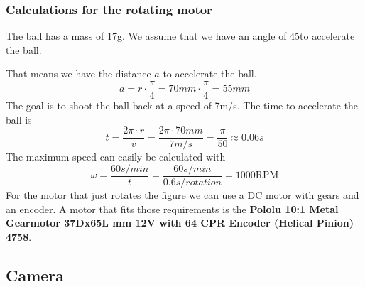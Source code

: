 \subsubsection{Calculations for the rotating motor}\label{subsubsec:rotating_motor}
The ball has a mass of 17g.
We assume that we have an angle of 45\deg  to accelerate the ball.
\\
\begin{center}
\end{center}
That means we have the distance $a$ to accelerate the ball.
\begin{equation}
    \label{eq:distance}
    a = r \cdot \frac{\pi}{4} = 70mm \cdot \frac{\pi}{4} = 55mm
\end{equation}
The goal is to shoot the ball back at a speed of 7m/s.
The time to accelerate the ball is
\begin{equation}
    \label{eq:time}
    t = \frac{2\pi\cdot r}{v} = \frac{2\pi\cdot 70mm}{7m/s} = \frac{\pi}{50} \approx 0.06s
\end{equation}
The maximum speed can easily be calculated with
\begin{equation}
    \label{eq:max_speed}
    \omega = \frac{60s/min}{t} = \frac{60s/min}{0.6s/rotation} = 1000\text{RPM}
\end{equation}
For the motor that just rotates the figure we can use a DC motor with gears and an encoder.
A motor that fits those requirements is the \textbf{Pololu 10:1 Metal Gearmotor 37Dx65L mm 12V with 64 CPR Encoder (Helical Pinion) 4758}.

\subsection{Camera}\label{subsec:camera}

